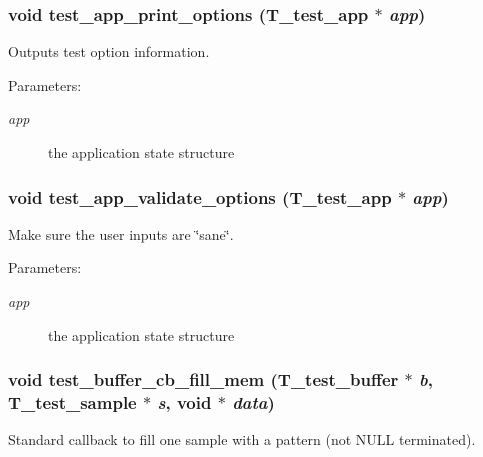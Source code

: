 \subsubsection{\setlength{\rightskip}{0pt plus 5cm}void test\_\-app\_\-print\_\-options ({\bf T\_\-test\_\-app} $\ast$ {\em app})}\label{test__utils_8h_a37}


Outputs test option information.

\begin{Desc}
\item[Parameters: ]\par
\begin{description}
\item[{\em 
app}]the application state structure \end{description}
\end{Desc}
\subsubsection{\setlength{\rightskip}{0pt plus 5cm}void test\_\-app\_\-validate\_\-options ({\bf T\_\-test\_\-app} $\ast$ {\em app})}\label{test__utils_8h_a38}


Make sure the user inputs are \char`\"{}sane\char`\"{}.

\begin{Desc}
\item[Parameters: ]\par
\begin{description}
\item[{\em 
app}]the application state structure \end{description}
\end{Desc}
\subsubsection{\setlength{\rightskip}{0pt plus 5cm}void test\_\-buffer\_\-cb\_\-fill\_\-mem ({\bf T\_\-test\_\-buffer} $\ast$ {\em b}, {\bf T\_\-test\_\-sample} $\ast$ {\em s}, void $\ast$ {\em data})}\label{test__utils_8h_a47}


Standard callback to fill one sample with a pattern (not NULL terminated).

